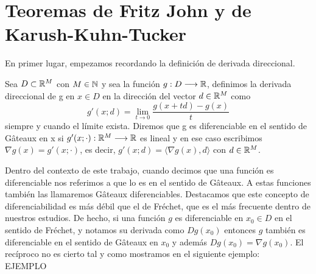 \chapter{Teoremas de Fritz John y de Karush-Kuhn-Tucker}
		\newcommand{\barx}{\bar{x} }
		\newcommand{\dd}{\textbf{\emph{d}}}
		
	En primer lugar, empezamos recordando la definición de derivada direccional. 
	\begin{definicion}
			Sea $ D \subset \mathbb{R}^M $ con $ M \in \mathbb{N} $ y sea la función $ g: D \longrightarrow  \mathbb{R}$, definimos la derivada direccional de g en $ x \in D $ en la dirección del vector $ d\in \mathbb{R}^M $ como
			\[
			g'(x;d) = \lim_{t\rightarrow0}\frac{g(x+td) - g(x)}{t}
			\]
			siempre y cuando el límite exista. Diremos que g es diferenciable en el sentido de Gâteaux en x si $ g'(x;\cdot):\mathbb{R}^M \longrightarrow \mathbb{R} $ es lineal y en ese caso escribimos $ \nabla g(x) = g'(x;\cdot) $, es decir, $ g'(x;d) = \langle \nabla g(x), d\rangle $ con $ d \in \mathbb{R}^M $.
	\end{definicion}
	
	Dentro del contexto de este trabajo, cuando decimos que una función es diferenciable nos referimos a que lo es en el sentido de Gâteaux. A estas funciones también las llamaremos Gâteaux diferenciables. Destacamos que este concepto de diferenciabilidad es más débil que el de Fréchet, que es el más frecuente dentro de nuestros estudios. De hecho, si una función $ g $ es diferenciable en $ x_0 \in D$ en el sentido de Fréchet, y notamos su derivada como $ Dg(x_0) $ entonces $ g $ también es diferenciable en el sentido de Gâteaux en $ x_0 $ y además $ Dg(x_0) = \nabla g(x_0) $. El recíproco no es cierto tal y como mostramos en el siguiente ejemplo:\\
	
	EJEMPLO \\
	
